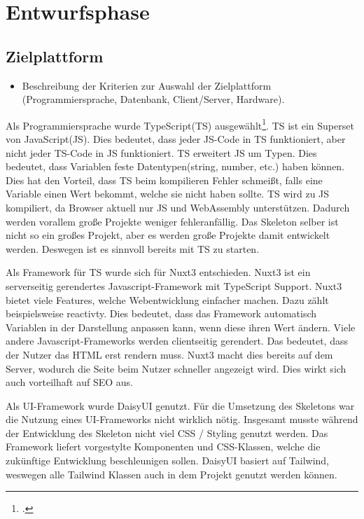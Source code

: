 \section{Entwurfsphase} 
\label{sec:Entwurfsphase}

\subsection{Zielplattform}
\label{sec:Zielplattform}

\begin{itemize}
	\item Beschreibung der Kriterien zur Auswahl der Zielplattform (\ua Programmiersprache, Datenbank, Client/Server, Hardware).
\end{itemize}

Als Programmiersprache wurde TypeScript(\acs{TS}) ausgewählt\footnote{\Vgl \citet{TypeScript}.}. \acs{TS} ist ein Superset von JavaScript(\acs{JS}). Dies bedeutet, dass jeder JS-Code in \acs{TS} funktioniert, aber nicht jeder \acs{TS}-Code in JS funktioniert. \acs{TS} erweitert JS um Typen. Dies bedeutet, dass Variablen feste Datentypen(string, number, etc.) haben können. Dies hat den Vorteil, dass \acs{TS} beim kompilieren Fehler schmeißt, falls eine Variable einen Wert bekommt, welche sie nicht haben sollte. \acs{TS} wird zu JS kompiliert, da Browser aktuell nur JS und WebAssembly unterstützen. Dadurch werden vorallem große Projekte weniger fehleranfällig. Das Skeleton selber ist nicht so ein großes Projekt, aber es werden große Projekte damit entwickelt werden. Deswegen ist es sinnvoll bereits mit \acs{TS} zu starten.

Als Framework für TS wurde sich für Nuxt3 entschieden. Nuxt3 ist ein serverseitig gerendertes Javascript-Framework mit TypeScript Support. Nuxt3 bietet viele Features, welche Webentwicklung einfacher machen. Dazu zählt beispielsweise reactivty. Dies bedeutet, dass das Framework automatisch Variablen in der Darstellung anpassen kann, wenn diese ihren Wert ändern. Viele andere Javascript-Frameworks werden clientseitig gerendert. Das bedeutet, dass der Nutzer das HTML erst rendern muss. Nuxt3 macht dies bereits auf dem Server, wodurch die Seite beim Nutzer schneller angezeigt wird. Dies wirkt sich auch vorteilhaft auf SEO aus.

Als UI-Framework wurde DaisyUI genutzt. Für die Umsetzung des Skeletons war die Nutzung eines UI-Frameworks nicht wirklich nötig. Insgesamt musste während der Entwicklung des Skeleton nicht viel CSS / Styling genutzt werden. Das Framework liefert vorgestylte Komponenten und CSS-Klassen, welche die zukünftige Entwicklung beschleunigen sollen. DaisyUI basiert auf Tailwind, weswegen alle Tailwind Klassen auch in dem Projekt genutzt werden können.

